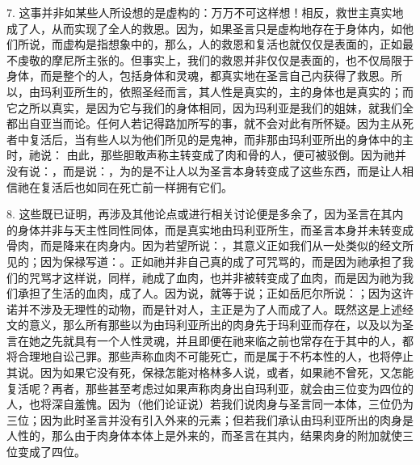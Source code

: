 7. 这事并非如某些人所设想的是虚构的：万万不可这样想！相反，救世主真实地成了人，从而实现了全人的救恩。因为，如果圣言只是虚构地存在于身体内，如他们所说，而虚构是指想象中的，那么，人的救恩和复活也就仅仅是表面的，正如最不虔敬的摩尼所主张的。但事实上，我们的救恩并非仅仅是表面的，也不仅局限于身体，而是整个的人，包括身体和灵魂，都真实地在圣言自己内获得了救恩。所以，由玛利亚所生的，依照圣经而言，其人性是真实的，主的身体也是真实的；而它之所以真实，是因为它与我们的身体相同，因为玛利亚是我们的姐妹，就我们全都出自亚当而论。任何人若记得路加所写的事，就不会对此有所怀疑。因为主从死者中复活后，当有些人以为他们所见的是鬼神，而非那由玛利亚所出的身体中的主时，祂说： 由此，那些胆敢声称主转变成了肉和骨的人，便可被驳倒。因为祂并没有说：，而是说：，为的是不让人以为圣言本身转变成了这些东西，而是让人相信祂在复活后也如同在死亡前一样拥有它们。\par

8. 这些既已证明，再涉及其他论点或进行相关讨论便是多余了，因为圣言在其内的身体并非与天主性同性同体，而是真实地由玛利亚所生，而圣言本身并未转变成骨肉，而是降来在肉身内。因为若望所说：，其意义正如我们从一处类似的经文所见的；因为保禄写道：。正如祂并非自己真的成了可咒骂的，而是因为祂承担了我们的咒骂才这样说，同样，祂成了血肉，也并非被转变成了血肉，而是因为祂为我们承担了生活的血肉，成了人。因为说，就等于说；正如岳厄尔所说：；因为这许诺并不涉及无理性的动物，而是针对人，主正是为了人而成了人。既然这是上述经文的意义，那么所有那些以为由玛利亚所出的肉身先于玛利亚而存在，以及以为圣言在她之先就具有一个人性灵魂，并且即便在祂来临之前也常存在于其中的人，都将合理地自讼己罪。那些声称血肉不可能死亡，而是属于不朽本性的人，也将停止其说。因为如果它没有死，保禄怎能对格林多人说，或者，如果祂不曾死，又怎能复活呢？再者，那些甚至考虑过如果声称肉身出自玛利亚，就会由三位变为四位的人，也将深自羞愧。因为（他们论证说）若我们说肉身与圣言同一本体，三位仍为三位；因为此时圣言并没有引入外来的元素；但若我们承认由玛利亚所出的肉身是人性的，那么由于肉身体本体上是外来的，而圣言在其内，结果肉身的附加就使三位变成了四位。\par

